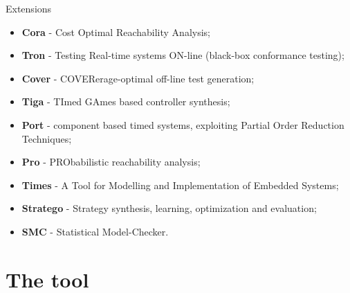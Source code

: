 \documentclass{beamer}
\begin{document}
\begin{frame}{Extensions}
	
	\begin{itemize}
		\item \textbf{Cora} - Cost Optimal Reachability Analysis;
		\item \textbf{Tron} - Testing Real-time systems ON-line (black-box conformance testing);
		\item \textbf{Cover} - COVERerage-optimal off-line test generation;
		\item \textbf{Tiga} - TImed GAmes based controller synthesis;
		\item \textbf{Port} - component based timed systems, exploiting Partial Order Reduction Techniques;
		\item \textbf{Pro} - PRObabilistic reachability analysis;
		\item \textbf{Times} - A Tool for Modelling and Implementation of Embedded Systems;
		\item \textbf{Stratego} - Strategy synthesis, learning, optimization and evaluation;
		\item \textbf{SMC} - Statistical Model-Checker.
	\end{itemize}
	
\end{frame}

\section{The tool}
\end{document}
